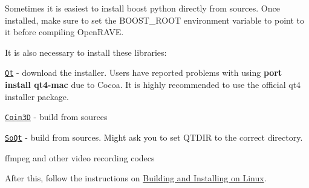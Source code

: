 Sometimes it is easiest to install boost python directly from sources. Once installed, make sure to set the {\ttfamily BOOST\_\-ROOT} environment variable to point to it before compiling OpenRAVE.

It is also necessary to install these libraries:


\begin{DoxyItemize}
\item \href{http://trolltech.com/developer/downloads/qt/mac}{\tt Qt} -\/ download the installer. Users have reported problems with using {\bfseries port install qt4-\/mac} due to Cocoa. It is highly recommended to use the official qt4 installer package.
\item \href{http://www.coin3d.org/lib/coin}{\tt Coin3D} -\/ build from sources
\item \href{http://www.coin3d.org/lib/soqt}{\tt SoQt} -\/ build from sources. Might ask you to set QTDIR to the correct directory.
\item ffmpeg and other video recording codecs
\end{DoxyItemize}

After this, follow the instructions on \hyperlink{installation__linux}{Building and Installing on Linux}. 